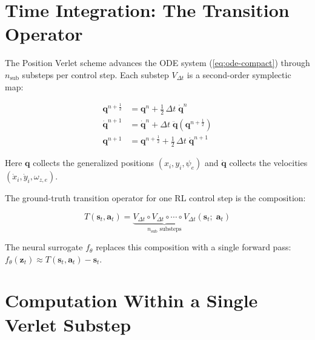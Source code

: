 \documentclass[11pt]{article}
\newcommand{\vect}[1]{\mathbf{#1}}
\begin{document}
\section{Time Integration: The Transition Operator}
\label{sec:integration}

The Position Verlet scheme advances the ODE system (\ref{eq:ode-compact}) through $n_{\text{sub}}$ substeps per control step.
Each substep $V_{\Delta t}$ is a second-order symplectic map:

\begin{subequations}
\label{eq:verlet}
\begin{align}
  \vect{q}^{n+\frac{1}{2}}
    &= \vect{q}^{n} + \tfrac{1}{2}\,\Delta t\;\dot{\vect{q}}^{n}
  \label{eq:verlet-half} \\[4pt]
  \dot{\vect{q}}^{n+1}
    &= \dot{\vect{q}}^{n} + \Delta t\;\ddot{\vect{q}}(\vect{q}^{n+\frac{1}{2}})
  \label{eq:verlet-vel} \\[4pt]
  \vect{q}^{n+1}
    &= \vect{q}^{n+\frac{1}{2}} + \tfrac{1}{2}\,\Delta t\;\dot{\vect{q}}^{n+1}
  \label{eq:verlet-full}
\end{align}
\end{subequations}

\noindent
Here $\vect{q}$ collects the generalized positions $(x_i, y_i, \psi_e)$ and $\dot{\vect{q}}$ collects the velocities $(\dot{x}_i, \dot{y}_i, \omega_{z,e})$.

The ground-truth transition operator for one RL control step is the composition:

\begin{equation}
  T(\vect{s}_t, \vect{a}_t)
    = \underbrace{V_{\Delta t} \circ V_{\Delta t} \circ \cdots \circ V_{\Delta t}}_{n_{\text{sub}} \text{ substeps}}
      (\vect{s}_t;\; \vect{a}_t)
  \label{eq:transition}
\end{equation}

The neural surrogate $f_\theta$ replaces this composition with a single forward pass:
$f_\theta(\vect{z}_t) \approx T(\vect{s}_t, \vect{a}_t) - \vect{s}_t$.

\section{Computation Within a Single Verlet Substep}
\label{sec:substep-detail}
\end{document}
